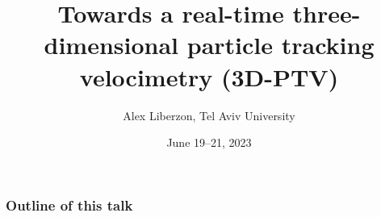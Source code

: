 \documentclass[aspectratio=169]{beamer}
\title{Towards a real-time three-dimensional particle tracking velocimetry (3D-PTV)}
\date{June 19--21, 2023}
\author[Liberzon]{Alex Liberzon, Tel Aviv University}
\begin{document}
\begin{frame}
    \titlepage
\end{frame}

\begin{frame}\frametitle{Outline of this talk}
    \begin{card}	
    \tableofcontents
    \end{card}
\end{frame}





% 
% 
% 
% 

% 
\end{document}
